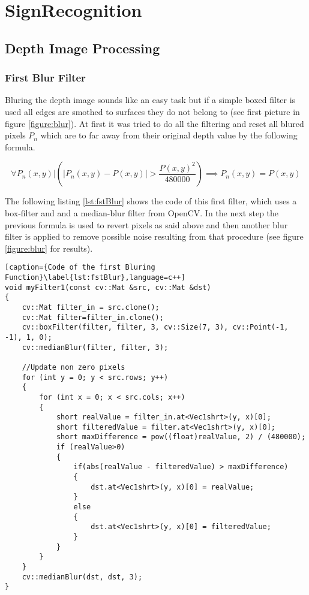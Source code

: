 \chapter{SignRecognition}
\graphicspath{{./Software/img/}}
 
\section{Depth Image Processing}

\subsection{First Blur Filter}
Bluring the depth image sounds like an easy task but if a simple boxed filter is used all edges are smothed to surfaces
they do not belong to (see first picture in figure \vref{figure:blur}).
At first it was tried to do all the filtering and reset all blured pixels $P_n$ which are to far away from their 
original depth value by the following formula.

\[
 \forall P_n(x,y)  |   \left(\left|{P_n(x,y)-P(x,y)}\right|>{\frac{P(x,y)^2}{480000}}\right)\implies P_n(x,y)=P(x,y)
\]

The following listing \vref{lst:fstBlur} shows the code of this first filter, which uses a box-filter and and a 
median-blur filter from OpenCV. In the next step the previous formula is used to revert pixels as said above and 
then another blur filter is applied to remove possible noise resulting from that procedure 
(see figure \vref{figure:blur} for results).

\newpage

\begin{lstlisting}[caption={Code of the first Bluring Function}\label{lst:fstBlur},language=c++]
void myFilter1(const cv::Mat &src, cv::Mat &dst)
{
	cv::Mat filter_in = src.clone();
	cv::Mat filter=filter_in.clone();
	cv::boxFilter(filter, filter, 3, cv::Size(7, 3), cv::Point(-1, -1), 1, 0);
	cv::medianBlur(filter, filter, 3);
	
	//Update non zero pixels
	for (int y = 0; y < src.rows; y++)
	{
		for (int x = 0; x < src.cols; x++)
		{
			short realValue = filter_in.at<Vec1shrt>(y, x)[0];
			short filteredValue = filter.at<Vec1shrt>(y, x)[0];
			short maxDifference = pow((float)realValue, 2) / (480000);
			if (realValue>0)
			{
				if(abs(realValue - filteredValue) > maxDifference)
				{
					dst.at<Vec1shrt>(y, x)[0] = realValue;
				}
				else
				{
					dst.at<Vec1shrt>(y, x)[0] = filteredValue;
				}
			}
		}
	}
	cv::medianBlur(dst, dst, 3);
}
\end{lstlisting}

